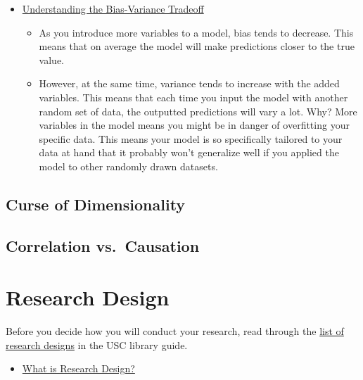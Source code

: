 \documentclass[]{book}
\providecommand{\tightlist}{%
  \setlength{\itemsep}{0pt}\setlength{\parskip}{0pt}}
\begin{document}
\begin{itemize}
\tightlist
\item
  \href{https://towardsdatascience.com/understanding-the-bias-variance-tradeoff-165e6942b229}{Understanding the Bias-Variance Tradeoff}

  \begin{itemize}
  \tightlist
  \item
    As you introduce more variables to a model, bias tends to decrease. This means that on average the model will make predictions closer to the true value.
  \item
    However, at the same time, variance tends to increase with the added variables. This means that each time you input the model with another random set of data, the outputted predictions will vary a lot. Why? More variables in the model means you might be in danger of overfitting your specific data. This means your model is so specifically tailored to your data at hand that it probably won't generalize well if you applied the model to other randomly drawn datasets.
  \end{itemize}
\end{itemize}

\hypertarget{curse-of-dimensionality}{%
\section{Curse of Dimensionality}\label{curse-of-dimensionality}}

\hypertarget{correlation-vs.-causation}{%
\section{Correlation vs.~Causation}\label{correlation-vs.-causation}}

\hypertarget{research-design}{%
\chapter{Research Design}\label{research-design}}

Before you decide how you will conduct your research, read through the \href{https://libguides.usc.edu/writingguide/researchdesigns}{list of research designs} in the USC library guide.

\begin{itemize}
\tightlist
\item
  \href{https://www.nyu.edu/classes/bkg/methods/005847ch1.pdf}{What is Research Design?}
\end{itemize}
\end{document}
